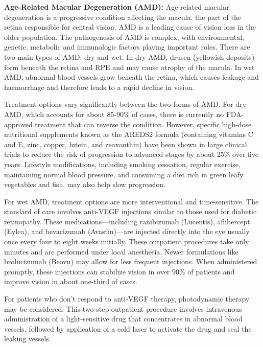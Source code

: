 \documentclass[
  Letterpaper,
]{scrbook}
\begin{document}
\textbf{Age-Related Macular Degeneration (AMD):} Age-related macular
degeneration is a progressive condition affecting the macula, the part
of the retina responsible for central vision. AMD is a leading cause of
vision loss in the older population. The pathogenesis of AMD is complex,
with environmental, genetic, metabolic and immunologic factors playing
important roles. There are two main types of AMD: dry and wet. In dry
AMD, drusen (yellowish deposits) form beneath the retina and RPE and may
cause atrophy of the macula. In wet AMD, abnormal blood vessels grow
beneath the retina, which causes leakage and haemorrhage and therefore
leads to a rapid decline in vision.

Treatment options vary significantly between the two forms of AMD. For
dry AMD, which accounts for about 85-90\% of cases, there is currently
no FDA-approved treatment that can reverse the condition. However,
specific high-dose nutritional supplements known as the AREDS2 formula
(containing vitamins C and E, zinc, copper, lutein, and zeaxanthin) have
been shown in large clinical trials to reduce the risk of progression to
advanced stages by about 25\% over five years. Lifestyle modifications,
including smoking cessation, regular exercise, maintaining normal blood
pressure, and consuming a diet rich in green leafy vegetables and fish,
may also help slow progression.

For wet AMD, treatment options are more interventional and
time-sensitive. The standard of care involves anti-VEGF injections
similar to those used for diabetic retinopathy. These
medications---including ranibizumab (Lucentis), aflibercept (Eylea), and
bevacizumab (Avastin)---are injected directly into the eye usually once
every four to eight weeks initially. These outpatient procedures take
only minutes and are performed under local anesthesia. Newer
formulations like brolucizumab (Beovu) may allow for less frequent
injections. When administered promptly, these injections can stabilize
vision in over 90\% of patients and improve vision in about one-third of
cases.

For patients who don't respond to anti-VEGF therapy, photodynamic
therapy may be considered. This two-step outpatient procedure involves
intravenous administration of a light-sensitive drug that concentrates
in abnormal blood vessels, followed by application of a cold laser to
activate the drug and seal the leaking vessels.
\end{document}
